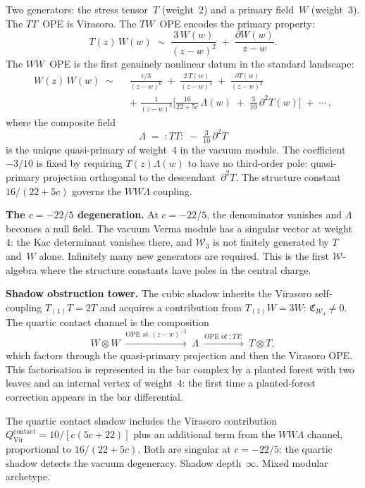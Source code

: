 \documentclass[11pt]{report}
\theoremstyle{definition}
\theoremstyle{remark}
\numberwithin{equation}{section}
\begin{document}
Two generators: the stress tensor~$T$ (weight~$2$) and a primary
field~$W$ (weight~$3$). The $TT$~OPE is Virasoro. The $TW$~OPE
encodes the primary property:
\[
T(z)\,W(w)
\;\sim\;
\frac{3\,W(w)}{(z-w)^2}
\;+\;
\frac{\partial W(w)}{z-w}.
\]
The $WW$~OPE is the first genuinely nonlinear datum in the standard
landscape:
\begin{align*}
W(z)\,W(w)
\;\sim\;\;
&\frac{c/3}{(z-w)^6}
\;+\;
\frac{2\,T(w)}{(z-w)^4}
\;+\;
\frac{\partial T(w)}{(z-w)^3}\\[4pt]
&+\;
\frac{1}{(z-w)^2}
\biggl[
\frac{16}{22+5c}\,\Lambda(w)
\;+\;
\frac{3}{10}\,\partial^2 T(w)
\biggr]
\;+\;\cdots\,,
\end{align*}
where the composite field
\[
\Lambda
\;=\;
{:}TT{:}\;-\;\tfrac{3}{10}\,\partial^2 T
\]
is the unique quasi-primary of weight~$4$ in the vacuum module. The
coefficient $-3/10$ is fixed by requiring $T(z)\Lambda(w)$ to have
no third-order pole: quasi-primary projection orthogonal to the
descendant~$\partial^2 T$. The structure constant
$16/(22+5c)$ governs the $WW\Lambda$ coupling.

\medskip
\noindent\textbf{The $c=-22/5$ degeneration.}
At $c=-22/5$, the denominator vanishes and $\Lambda$ becomes a null
field. The vacuum Verma module has a singular vector at weight~$4$:
the Kac determinant vanishes there, and $\mathcal W_3$ is not
finitely generated by $T$ and~$W$ alone. Infinitely many new
generators are required. This is the first $\mathcal W$-algebra
where the structure constants have poles in the central charge.

\medskip
\noindent\textbf{Shadow obstruction tower.}
The cubic shadow inherits the Virasoro self-coupling $T_{(1)}T=2T$
and acquires a contribution from $T_{(1)}W=3W$:
$\mathfrak{C}_{\mathcal W_3}\neq 0$. The quartic contact channel
is the composition
\[
W\otimes W
\;\xrightarrow{\text{OPE at }(z-w)^{-2}}\;
\Lambda
\;\xrightarrow{\text{OPE of }{:}TT{:}}\;
T\otimes T,
\]
which factors through the quasi-primary projection and then the
Virasoro OPE. This factorisation is represented in the bar complex
by a planted forest with two leaves and an internal vertex of
weight~$4$: the first time a planted-forest correction appears in the
bar differential.

The quartic contact shadow includes the Virasoro contribution
$Q^{\mathrm{contact}}_{\mathrm{Vir}}=10/[c(5c+22)]$ plus an
additional term from the $WW\Lambda$ channel, proportional to
$16/(22+5c)$. Both are singular at $c=-22/5$: the quartic shadow
detects the vacuum degeneracy. Shadow depth~$\infty$. Mixed modular
archetype.
\end{document}
